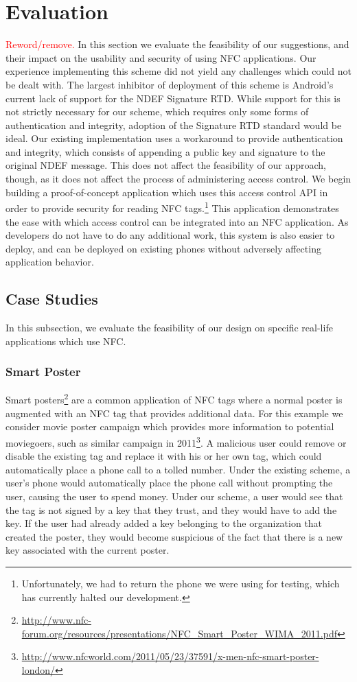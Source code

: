 \documentclass[12pt]{article}
\newcommand\TODO[1]{\textcolor{red}{#1}}
\begin{document}
\section{Evaluation}
\TODO{Reword/remove.}
In this section we evaluate the feasibility of our suggestions, and their impact on the usability and security of using NFC applications.
Our experience implementing this scheme did not yield any challenges which could not be dealt with.
The largest inhibitor of deployment of this scheme is Android's current lack of support for the NDEF Signature RTD.
While support for this is not strictly necessary for our scheme, which requires only some forms of authentication and integrity, adoption of the Signature RTD standard would be ideal.
Our existing implementation uses a workaround to provide authentication and integrity, which consists of appending a public key and signature to the original NDEF message.
This does not affect the feasibility of our approach, though, as it does not affect the process of administering access control.
We begin building a proof-of-concept application which uses this access control API in order to provide security for reading NFC tags.\footnote{Unfortunately, we had to return the phone we were using for testing, which has currently halted our development.}
This application demonstrates the ease with which access control can be integrated into an NFC application.
As developers do not have to do any additional work, this system is also easier to deploy, and can be deployed on existing phones without adversely affecting application behavior.

\subsection{Case Studies}
In this subsection, we evaluate the feasibility of our design on specific real-life applications which use NFC.

\subsubsection{Smart Poster}
Smart posters\footnote{\url{http://www.nfc-forum.org/resources/presentations/NFC_Smart_Poster_WIMA_2011.pdf}} are a common application of NFC tags where a normal poster is augmented with an NFC tag that provides additional data.
For this example we consider movie poster campaign which provides more information to potential moviegoers, such as similar campaign in 2011\footnote{\url{http://www.nfcworld.com/2011/05/23/37591/x-men-nfc-smart-poster-london/}}.
A malicious user could remove or disable the existing tag and replace it with his or her own tag, which could automatically place a phone call to a tolled number.
Under the existing scheme, a user's phone would automatically place the phone call without prompting the user, causing the user to spend money.
Under our scheme, a user would see that the tag is not signed by a key that they trust, and they would have to add the key.
If the user had already added a key belonging to the organization that created the poster, they would become suspicious of the fact that there is a new key associated with the current poster.
\end{document}
